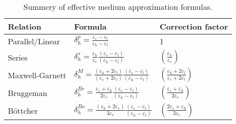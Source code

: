 \renewcommand\arraystretch{1.8}
\begin{table}
\caption{Summery of effective medium approximation formulas.}\label{tab:formula}
  \centering
  \begin{tabular}{lll}
  \hline
Relation & Formula &  Correction factor \\
\hline
Parallel/Linear &  $\delta_h^p = \frac{\varepsilon_{e}-\varepsilon_{l}}{\varepsilon_{h}-\varepsilon_{l}}$
       &   1 \\
Series & $\delta_h^s= \frac{\varepsilon_{h}}{\varepsilon_{e}}\frac{(\varepsilon_{e}-\varepsilon_{l})}{(\varepsilon_{h}-\varepsilon_{l})}$
& $\left(\frac{\varepsilon_h}{\varepsilon_e}\right)$\\
 Maxwell-Garnett &
$\delta_{h}^M
=\frac{(\varepsilon_{h}+2\varepsilon_{l})}{(\varepsilon_{e}+2\varepsilon_{l})}\frac{(\varepsilon_{e}-\varepsilon_{l})}{(\varepsilon_{h}-\varepsilon_{l})}
$&$\left(\frac{\varepsilon_{h}+2\varepsilon_{l}}{\varepsilon_{e}+2\varepsilon_{l}}\right)$\\
Bruggeman &  $\delta_h^{Br}= \frac{\varepsilon_{e}+\varepsilon_{h}}{2\varepsilon_{e}}\frac{(\varepsilon_{e}-\varepsilon_{l})}{(\varepsilon_{h}-\varepsilon_{l})}$
& $\left(\frac{\varepsilon_{e}+\varepsilon_{h}}{2\varepsilon_{e}}\right)$\\
B\"{o}ttcher &  $\delta_h^{Bo}=
  \frac{(\varepsilon_h+2\varepsilon_e)}{3\varepsilon_e}\frac{(\varepsilon_{e}-\varepsilon_{l})}{(\varepsilon_{h}-\varepsilon_{l})}$
&$ \left(\frac{2\varepsilon_{e}+\varepsilon_{h}}{3\varepsilon_{e}}\right)$ \\ \hline
  \end{tabular}
\end{table}
\renewcommand\arraystretch{1}

